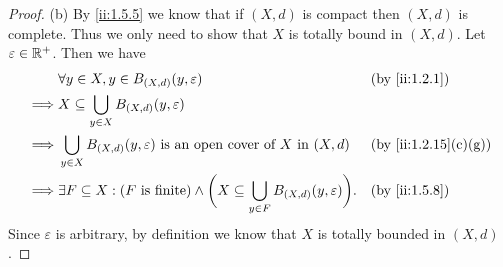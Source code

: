 \begin{proof}{(b)}
  By \cref{ii:1.5.5} we know that if \((X, d)\) is compact then \((X, d)\) is complete.
  Thus we only need to show that \(X\) is totally bound in \((X, d)\).
  Let \(\varepsilon \in \mathbb{R}^+\).
  Then we have
  \begin{align*}
             & \forall y \in X, y \in B_{(X, d)}(y, \varepsilon)                                                                         &  & \by{ii:1.2.1}       \\
    \implies & X \subseteq \bigcup_{y \in X} B_{(X, d)}(y, \varepsilon)                                                                                        \\
    \implies & \bigcup_{y \in X} B_{(X, d)}(y, \varepsilon) \text{ is an open cover of } X \text{ in } (X, d)                            &  & \by{ii:1.2.15}[c,g] \\
    \implies & \exists F \subseteq X : (F \text{ is finite}) \land \bigg(X \subseteq \bigcup_{y \in F} B_{(X, d)}(y, \varepsilon)\bigg). &  & \by{ii:1.5.8}
  \end{align*}
  Since \(\varepsilon\) is arbitrary, by definition we know that \(X\) is totally bounded in \((X, d)\).
\end{proof}

